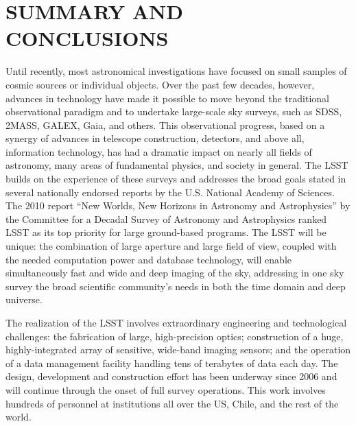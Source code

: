 \section{  SUMMARY AND CONCLUSIONS}
\label{Sec:conclusions}

Until recently, most astronomical investigations have focused on small
samples of cosmic sources or individual objects. Over the past few decades,
however, advances in technology have made it possible to move beyond the
traditional observational paradigm and to undertake large-scale sky
surveys, such as SDSS, 2MASS, GALEX, Gaia, and others. This observational
progress, based on a synergy of advances in telescope construction, detectors,
and above all, information technology, has had a dramatic impact on nearly all
fields of astronomy, many areas of fundamental physics, and society in
general. The LSST builds on the experience of these surveys and addresses
the broad goals stated in several nationally endorsed reports by the U.S.
National Academy of Sciences. The 2010 report ``New Worlds, New Horizons
in Astronomy and Astrophysics'' by the Committee for a Decadal Survey of Astronomy and
Astrophysics
ranked LSST as its top priority for large ground-based programs.
The LSST will be unique: the combination of large aperture and large field of view,
coupled with the needed computation power and database technology, will
enable simultaneously fast and wide and deep imaging of the sky, addressing in
one sky survey the broad scientific community's needs in both the
time domain and deep universe.

The realization of the LSST involves extraordinary engineering and
technological challenges: the fabrication of large, high-precision optics;
construction of a huge, highly-integrated array of sensitive, wide-band
imaging sensors; and the operation of a data management facility
handling tens of terabytes of data each day. The design, development
and construction
effort has been underway since 2006 and will continue through the
onset of full survey operations.  This work involves hundreds of
personnel at institutions all over the US, Chile, and the rest of the
world.

